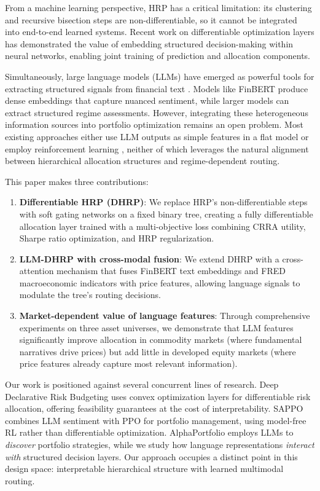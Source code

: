 \documentclass[11pt]{article}
\begin{document}
From a machine learning perspective, HRP has a critical limitation: its clustering and recursive bisection steps are non-differentiable, so it cannot be integrated into end-to-end learned systems. Recent work on differentiable optimization layers \citep{Agrawal2019, Amos2017} has demonstrated the value of embedding structured decision-making within neural networks, enabling joint training of prediction and allocation components.

Simultaneously, large language models (LLMs) have emerged as powerful tools for extracting structured signals from financial text \citep{Araci2019, Wu2023}. Models like FinBERT produce dense embeddings that capture nuanced sentiment, while larger models can extract structured regime assessments. However, integrating these heterogeneous information sources into portfolio optimization remains an open problem. Most existing approaches either use LLM outputs as simple features in a flat model \citep{Kirtac2025} or employ reinforcement learning \citep{Ye2020}, neither of which leverages the natural alignment between hierarchical allocation structures and regime-dependent routing.

This paper makes three contributions:
\begin{enumerate}
    \item \textbf{Differentiable HRP (DHRP)}: We replace HRP's non-differentiable steps with soft gating networks on a fixed binary tree, creating a fully differentiable allocation layer trained with a multi-objective loss combining CRRA utility, Sharpe ratio optimization, and HRP regularization.
    \item \textbf{LLM-DHRP with cross-modal fusion}: We extend DHRP with a cross-attention mechanism that fuses FinBERT text embeddings and FRED macroeconomic indicators with price features, allowing language signals to modulate the tree's routing decisions.
    \item \textbf{Market-dependent value of language features}: Through comprehensive experiments on three asset universes, we demonstrate that LLM features significantly improve allocation in commodity markets (where fundamental narratives drive prices) but add little in developed equity markets (where price features already capture most relevant information).
\end{enumerate}

Our work is positioned against several concurrent lines of research. Deep Declarative Risk Budgeting \citep{ParraDiaz2025} uses convex optimization layers for differentiable risk allocation, offering feasibility guarantees at the cost of interpretability. SAPPO \citep{Kirtac2025} combines LLM sentiment with PPO for portfolio management, using model-free RL rather than differentiable optimization. AlphaPortfolio \citep{Cong2025} employs LLMs to \emph{discover} portfolio strategies, while we study how language representations \emph{interact with} structured decision layers. Our approach occupies a distinct point in this design space: interpretable hierarchical structure with learned multimodal routing.
\end{document}
